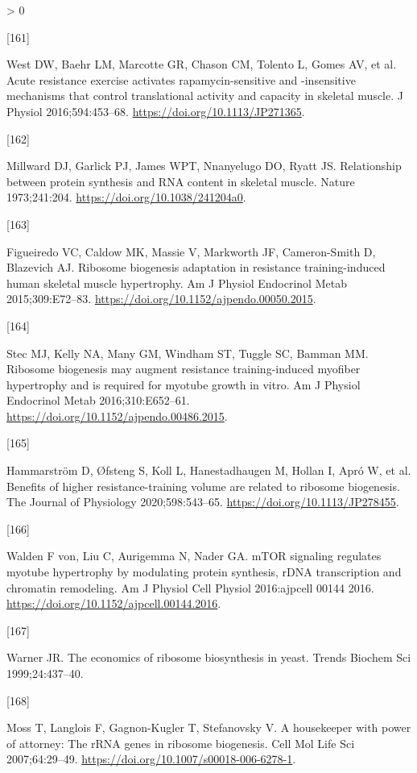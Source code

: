 \documentclass[twoside,10pt]{gihclass} %
\newlength{\cslhangindent}
\newlength{\csllabelwidth}
\newenvironment{CSLReferences}[3] %
 {%
  \setlength{\parindent}{0pt}
  \ifodd #1 \everypar{\setlength{\hangindent}{\cslhangindent}}\ignorespaces\fi
  \ifnum #2 > 0
  \setlength{\parskip}{#2\baselineskip}
  \fi
 }%
 {}
\newcommand{\CSLLeftMargin}[1]{\parbox[t]{\maxof{\widthof{#1}}{\csllabelwidth}}{#1}}
\newcommand{\CSLRightInline}[1]{\parbox[t]{\linewidth}{#1}}
\begin{document}
\begin{CSLReferences}{0}{0}
\leavevmode\hypertarget{ref-RN1754}{}%
\CSLLeftMargin{{[}161{]} }
\CSLRightInline{West DW, Baehr LM, Marcotte GR, Chason CM, Tolento L, Gomes AV, et al. Acute resistance exercise activates rapamycin-sensitive and -insensitive mechanisms that control translational activity and capacity in skeletal muscle. J Physiol 2016;594:453--68. \url{https://doi.org/10.1113/JP271365}.}

\leavevmode\hypertarget{ref-RN2145}{}%
\CSLLeftMargin{{[}162{]} }
\CSLRightInline{Millward DJ, Garlick PJ, James WPT, Nnanyelugo DO, Ryatt JS. Relationship between protein synthesis and RNA content in skeletal muscle. Nature 1973;241:204. \url{https://doi.org/10.1038/241204a0}.}

\leavevmode\hypertarget{ref-RN1644}{}%
\CSLLeftMargin{{[}163{]} }
\CSLRightInline{Figueiredo VC, Caldow MK, Massie V, Markworth JF, Cameron-Smith D, Blazevich AJ. Ribosome biogenesis adaptation in resistance training-induced human skeletal muscle hypertrophy. Am J Physiol Endocrinol Metab 2015;309:E72--83. \url{https://doi.org/10.1152/ajpendo.00050.2015}.}

\leavevmode\hypertarget{ref-RN1755}{}%
\CSLLeftMargin{{[}164{]} }
\CSLRightInline{Stec MJ, Kelly NA, Many GM, Windham ST, Tuggle SC, Bamman MM. Ribosome biogenesis may augment resistance training-induced myofiber hypertrophy and is required for myotube growth in vitro. Am J Physiol Endocrinol Metab 2016;310:E652--61. \url{https://doi.org/10.1152/ajpendo.00486.2015}.}

\leavevmode\hypertarget{ref-RN2358}{}%
\CSLLeftMargin{{[}165{]} }
\CSLRightInline{Hammarström D, Øfsteng S, Koll L, Hanestadhaugen M, Hollan I, Apró W, et al. Benefits of higher resistance-training volume are related to ribosome biogenesis. The Journal of Physiology 2020;598:543--65. \url{https://doi.org/10.1113/JP278455}.}

\leavevmode\hypertarget{ref-RN1810}{}%
\CSLLeftMargin{{[}166{]} }
\CSLRightInline{Walden F von, Liu C, Aurigemma N, Nader GA. mTOR signaling regulates myotube hypertrophy by modulating protein synthesis, rDNA transcription and chromatin remodeling. Am J Physiol Cell Physiol 2016:ajpcell 00144 2016. \url{https://doi.org/10.1152/ajpcell.00144.2016}.}

\leavevmode\hypertarget{ref-RN1920}{}%
\CSLLeftMargin{{[}167{]} }
\CSLRightInline{Warner JR. The economics of ribosome biosynthesis in yeast. Trends Biochem Sci 1999;24:437--40.}

\leavevmode\hypertarget{ref-RN1820}{}%
\CSLLeftMargin{{[}168{]} }
\CSLRightInline{Moss T, Langlois F, Gagnon-Kugler T, Stefanovsky V. A housekeeper with power of attorney: The rRNA genes in ribosome biogenesis. Cell Mol Life Sci 2007;64:29--49. \url{https://doi.org/10.1007/s00018-006-6278-1}.}


\end{CSLReferences}
\end{document}
